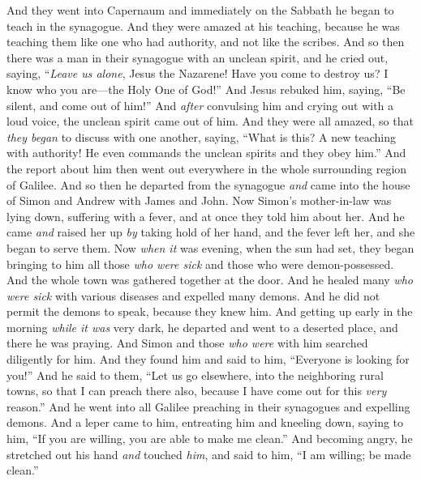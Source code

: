 \begin{biblechapter}
\verse And they went into Capernaum and immediately on the Sabbath he began to teach in the synagogue.
 And they were amazed at his teaching, because he was teaching them like one who had authority, and not like the scribes.
\verse And so then there was a man in their synagogue with an unclean spirit, and he cried out,
\verse saying, “\textit{Leave us alone}, Jesus the Nazarene! Have you come to destroy us? I know who you are—the Holy One of God!”
\verse And Jesus rebuked him, saying, “Be silent, and come out of him!”
\verse And \textit{after} convulsing him and crying out with a loud voice, the unclean spirit came out of him.
\verse And they were all amazed, so that \textit{they began} to discuss with one another, saying, “What is this? A new teaching with authority! He even commands the unclean spirits and they obey him.”
\verse And the report about him then went out everywhere in the whole surrounding region of Galilee.
 And so then he departed from the synagogue \textit{and} came into the house of Simon and Andrew with James and John.
\verse Now Simon’s mother-in-law was lying down, suffering with a fever, and at once they told him about her.
\verse And he came \textit{and} raised her up \textit{by} taking hold of her hand, and the fever left her, and she began to serve them.
\verse Now \textit{when it} was evening, when the sun had set, they began bringing to him all those \textit{who were sick} and those who were demon-possessed.
\verse And the whole town was gathered together at the door.
\verse And he healed many \textit{who were sick} with various diseases and expelled many demons. And he did not permit the demons to speak, because they knew him.
 And getting up early in the morning \textit{while it was} very dark, he departed and went to a deserted place, and there he was praying.
\verse And Simon and those \textit{who were} with him searched diligently for him.
\verse And they found him and said to him, “Everyone is looking for you!”
\verse And he said to them, “Let us go elsewhere, into the neighboring rural towns, so that I can preach there also, because I have come out for this \textit{very} reason.”
\verse And he went into all Galilee preaching in their synagogues and expelling demons.
 And a leper came to him, entreating him and kneeling down, saying to him, “If you are willing, you are able to make me clean.”
\verse And becoming angry, he stretched out his hand \textit{and} touched \textit{him}, and said to him, “I am willing; be made clean.”

\end{biblechapter}
